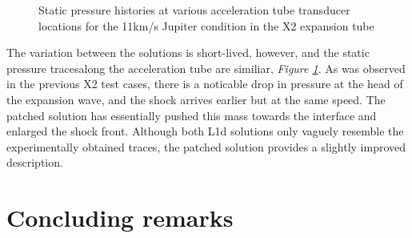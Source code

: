 \documentclass[a4paper,10pt]{article}
\begin{document}
\begin{figure}[htbp]
\begin{center}
{{      } \quad
      }
    \caption{Static pressure histories at various acceleration tube transducer locations for the 11km/s Jupiter condition in the X2 expansion tube}
    \label{fig:jupiter_atx_p}
  \end{center}
\end{figure}

The variation between the solutions is short-lived, however, and the static pressure tracesalong the acceleration tube are similiar, \emph{Figure \ref{fig:jupiter_atx_p}}.  As was observed in the previous X2 test cases, there is a noticable drop in pressure at the head of the expansion wave, and the shock arrives earlier but at the same speed.  The patched solution has essentially pushed this mass towards the interface and enlarged the shock front.  Although both L1d solutions only vaguely resemble the experimentally obtained traces, the patched solution provides a slightly improved description.

\newpage

\newpage

\section{Concluding remarks}
\end{document}
